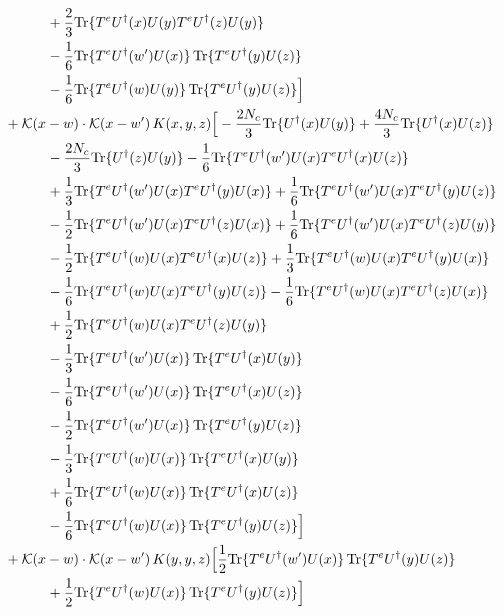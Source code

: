\documentclass[10pt]{article}
\numberwithin{equation}{section}
\begin{document}
\begin{align}
&\quad\quad\quad+\frac{2}{3}{\rm Tr}\{T^eU^\dagger(x)U(y)T^eU^\dagger(z)U(y)\}\notag\\
&\quad\quad\quad-\frac{1}{6}{\rm Tr}\{T^eU^\dagger(w')U(x)\}\,{\rm Tr}\{T^eU^\dagger(y)U(z)\}\notag\\
&\quad\quad\quad-\frac{1}{6}{\rm Tr}\{T^eU^\dagger(w)U(y)\}\,{\rm Tr}\{T^eU^\dagger(y)U(z)\}\Big]\notag\\
&+\mathcal K(x-w)\cdot\mathcal K(x-w')\,K(x,y,z)\Big[-\frac{2 N_c}{3}{\rm Tr}\{U^\dagger(x)U(y)\}+\frac{4 N_c}{3}{\rm Tr}\{U^\dagger(x)U(z)\}\notag\\
&\quad\quad\quad-\frac{2 N_c}{3}{\rm Tr}\{U^\dagger(z)U(y)\}-\frac{1}{6}{\rm Tr}\{T^eU^\dagger(w')U(x)T^eU^\dagger(x)U(z)\}\notag\\
&\quad\quad\quad+\frac{1}{3}{\rm Tr}\{T^eU^\dagger(w')U(x)T^eU^\dagger(y)U(x)\}+\frac{1}{6}{\rm Tr}\{T^eU^\dagger(w')U(x)T^eU^\dagger(y)U(z)\}\notag\\
&\quad\quad\quad-\frac{1}{2}{\rm Tr}\{T^eU^\dagger(w')U(x)T^eU^\dagger(z)U(x)\}+\frac{1}{6}{\rm Tr}\{T^eU^\dagger(w')U(x)T^eU^\dagger(z)U(y)\}\notag\\
&\quad\quad\quad-\frac{1}{2}{\rm Tr}\{T^eU^\dagger(w)U(x)T^eU^\dagger(x)U(z)\}+\frac{1}{3}{\rm Tr}\{T^eU^\dagger(w)U(x)T^eU^\dagger(y)U(x)\}\notag\\
&\quad\quad\quad-\frac{1}{6}{\rm Tr}\{T^eU^\dagger(w)U(x)T^eU^\dagger(y)U(z)\}-\frac{1}{6}{\rm Tr}\{T^eU^\dagger(w)U(x)T^eU^\dagger(z)U(x)\}\notag\\
&\quad\quad\quad+\frac{1}{2}{\rm Tr}\{T^eU^\dagger(w)U(x)T^eU^\dagger(z)U(y)\}\notag\\
&\quad\quad\quad-\frac{1}{3}{\rm Tr}\{T^eU^\dagger(w')U(x)\}\,{\rm Tr}\{T^eU^\dagger(x)U(y)\}\notag\\
&\quad\quad\quad-\frac{1}{6}{\rm Tr}\{T^eU^\dagger(w')U(x)\}\,{\rm Tr}\{T^eU^\dagger(x)U(z)\}\notag\\
&\quad\quad\quad-\frac{1}{2}{\rm Tr}\{T^eU^\dagger(w')U(x)\}\,{\rm Tr}\{T^eU^\dagger(y)U(z)\}\notag\\
&\quad\quad\quad-\frac{1}{3}{\rm Tr}\{T^eU^\dagger(w)U(x)\}\,{\rm Tr}\{T^eU^\dagger(x)U(y)\}\notag\\
&\quad\quad\quad+\frac{1}{6}{\rm Tr}\{T^eU^\dagger(w)U(x)\}\,{\rm Tr}\{T^eU^\dagger(x)U(z)\}\notag\\
&\quad\quad\quad-\frac{1}{6}{\rm Tr}\{T^eU^\dagger(w)U(x)\}\,{\rm Tr}\{T^eU^\dagger(y)U(z)\}\Big]\notag\\
&+\mathcal K(x-w)\cdot\mathcal K(x-w')\,K(y,y,z)\Big[\frac{1}{2}{\rm Tr}\{T^eU^\dagger(w')U(x)\}\,{\rm Tr}\{T^eU^\dagger(y)U(z)\}\notag\\
&\quad\quad\quad+\frac{1}{2}{\rm Tr}\{T^eU^\dagger(w)U(x)\}\,{\rm Tr}\{T^eU^\dagger(y)U(z)\}\Big]
\label{eq:G3IV}
\end{align}
\end{document}
